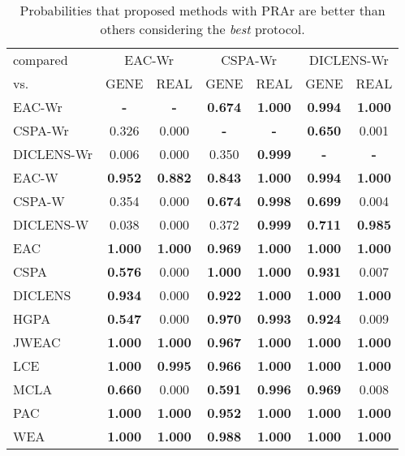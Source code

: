 \begin{table}
	\begin{center}
		\caption{Probabilities that proposed methods with PRAr are better than others considering the \emph{best} protocol.}
		\label{tab:bayescomp:best}
		\begin{tabular*}{1.0\linewidth}{@{\extracolsep{\fill}} l |c c |c c |c c }
			\hline
			compared  & \multicolumn{2}{|c}{EAC-Wr} & \multicolumn{2}{|c}{CSPA-Wr} & \multicolumn{2}{|c}{DICLENS-Wr}\\ 
			vs. & GENE & REAL & GENE & REAL & GENE & REAL \\ \hline
			EAC-Wr& \textbf{-} & \textbf{-}  & \textbf{0.674} & \textbf{1.000} & \textbf{0.994} & \textbf{1.000}\\
			CSPA-Wr & 0.326 & 0.000& \textbf{-} & \textbf{-}  & \textbf{0.650} & 0.001\\
			DICLENS-Wr & 0.006 & 0.000 & 0.350 & \textbf{0.999}& \textbf{-} & \textbf{-} \\
			EAC-W & \textbf{0.952} & \textbf{0.882} & \textbf{0.843} & \textbf{1.000} & \textbf{0.994} & \textbf{1.000}\\
			CSPA-W & 0.354 & 0.000 & \textbf{0.674} & \textbf{0.998} & \textbf{0.699} & 0.004\\
			DICLENS-W & 0.038 & 0.000 & 0.372 & \textbf{0.999} & \textbf{0.711} & \textbf{0.985}\\
			EAC & \textbf{1.000} & \textbf{1.000} & \textbf{0.969} & \textbf{1.000} & \textbf{1.000} & \textbf{1.000}\\
			CSPA & \textbf{0.576} & 0.000 & \textbf{1.000} & \textbf{1.000} & \textbf{0.931} & 0.007\\
			DICLENS & \textbf{0.934} & 0.000 & \textbf{0.922} & \textbf{1.000} & \textbf{1.000} & \textbf{1.000}\\
			HGPA & \textbf{0.547} & 0.000 & \textbf{0.970} & \textbf{0.993} & \textbf{0.924} & 0.009\\
			JWEAC & \textbf{1.000} & \textbf{1.000} & \textbf{0.967} & \textbf{1.000} & \textbf{1.000} & \textbf{1.000}\\
			LCE & \textbf{1.000} & \textbf{0.995} & \textbf{0.966} & \textbf{1.000} & \textbf{1.000} & \textbf{1.000}\\
			MCLA & \textbf{0.660} & 0.000 & \textbf{0.591} & \textbf{0.996} & \textbf{0.969} & 0.008\\
			PAC & \textbf{1.000} & \textbf{1.000} & \textbf{0.952} & \textbf{1.000} & \textbf{1.000} & \textbf{1.000}\\
			WEA & \textbf{1.000} & \textbf{1.000} & \textbf{0.988} & \textbf{1.000} & \textbf{1.000} & \textbf{1.000}\\
			\hline
		\end{tabular*}
	\end{center}
\end{table}
